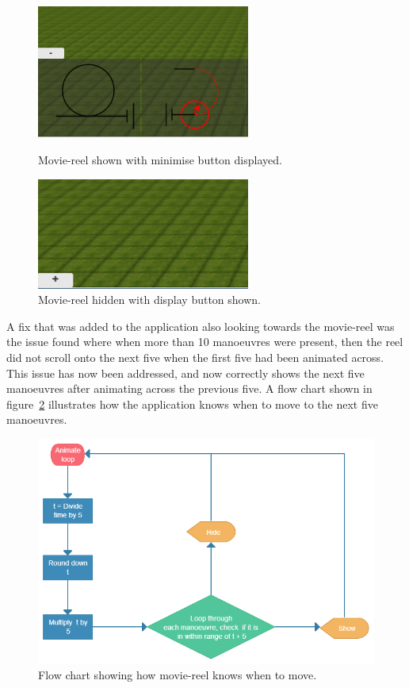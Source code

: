 \clearpage

\begin{figure}[h!]
  \centering
  \parbox{7cm}{
    \includegraphics[width=7cm]{images/minimise.png}
    \caption{Movie-reel shown with minimise button displayed.}
    \label{fig:minimise}}
  \qquad
  \begin{minipage}{7cm}
    \includegraphics[width=7cm]{images/maximise.png}
    \caption{Movie-reel hidden with display button shown.}
    \label{fig:maxmimise}
  \end{minipage}
\end{figure}

A fix that was added to the application also looking towards the movie-reel was the issue found where when more than 10 manoeuvres were present, then the reel did not scroll onto the next five when the first five had been animated across. This issue has now been addressed, and now correctly shows the next five manoeuvres after animating across the previous five. A flow chart shown in figure~\ref{fig:moves} illustrates how the application knows when to move to the next five manoeuvres.

\begin{figure}[h!]
  \centering
  \includegraphics[width=1\textwidth]{images/reel-flow.png}
  \caption{Flow chart showing how movie-reel knows when to move.}
  \label{fig:moves}
\end{figure}

